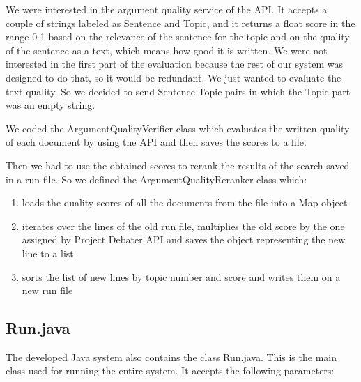       We were interested in the argument quality service of the API. It accepts a couple of strings labeled as Sentence and Topic, and it returns a float score in the range 0-1 based on the relevance of the sentence for the topic and on the quality of the sentence as a text, which means how good it is written. We were not interested in the first part of the evaluation because the rest of our system was designed to do that, so it would be redundant. We just wanted to evaluate the text quality. So we decided to send Sentence-Topic pairs in which the Topic part was an empty string.
      
      We coded the ArgumentQualityVerifier class which evaluates the written quality of each document by using the API and then saves the scores to a file.
      
      Then we had to use the obtained scores to rerank the results of the search saved in a run file. So we defined the ArgumentQualityReranker class which:
      
       \begin{enumerate} 
           \item loads the quality scores of all the documents from the file into a Map object \item iterates over the lines of the old run file, multiplies the old score by the one assigned by Project Debater API and saves the object representing the new line to a list \item sorts the list of new lines by topic number and score and writes them on a new run file 
       \end{enumerate}

\subsection{Run.java}

The developed Java system also contains the class Run.java. This is the main class used for running the entire system. It accepts the following parameters: 

